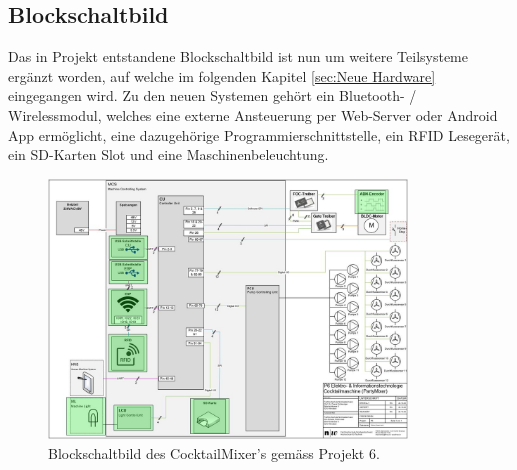 \subsection{Blockschaltbild}
\label{subsec:Blockschaldbild}

Das in Projekt entstandene Blockschaltbild ist nun um weitere Teilsysteme ergänzt worden, auf welche im folgenden Kapitel \ref{sec:Neue Hardware} eingegangen wird. Zu den neuen Systemen gehört ein Bluetooth- / Wirelessmodul, welches eine externe Ansteuerung per Web-Server oder Android App ermöglicht, eine dazugehörige Programmierschnittstelle, ein RFID Lesegerät, ein SD-Karten Slot und eine Maschinenbeleuchtung.

\begin{figure}[h!]
\center
\includegraphics[angle=90, width = 0.85\textwidth]{graphics/Blockschaltbild}
\caption{Blockschaltbild des CocktailMixer's gemäss Projekt 6.}
\label{fig:Blockschaltbild_Cocktailmixer}
\end{figure}

\newpage

